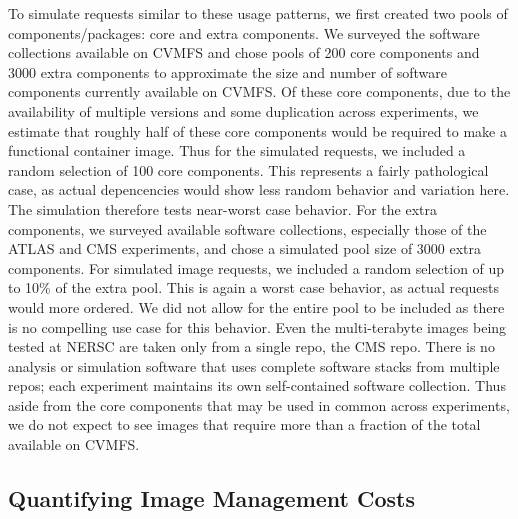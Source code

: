 \documentclass[sigconf]{acmart}
\begin{document}
To simulate requests similar to these usage patterns,
we first created two pools of components/packages: core and extra components.
We surveyed the software collections available on CVMFS and chose pools of 200 core components and 3000 extra components to approximate the size and number of software components currently available on CVMFS.
Of these core components,
due to the availability of multiple versions and some duplication across experiments,
we estimate that roughly half of these core components would be required to make a functional container image.
Thus for the simulated requests,
we included a random selection of 100 core components.
This represents a fairly pathological case,
as actual depencencies would show less random behavior and variation here.
The simulation therefore tests near-worst case behavior.
For the extra components,
we surveyed available software collections,
especially those of the ATLAS and CMS experiments,
and chose a simulated pool size of 3000 extra components.
For simulated image requests,
we included a random selection of up to 10\% of the extra pool.
This is again a worst case behavior,
as actual requests would more ordered.
We did not allow for the entire pool to be included as there is no compelling use case for this behavior.
Even the multi-terabyte images being tested at NERSC are taken only from a single repo,
the CMS repo.
There is no analysis or simulation software that uses complete software stacks from multiple repos;
each experiment maintains its own self-contained software collection.
Thus aside from the core components that may be used in common across experiments,
we do not expect to see images that require more than a fraction of the total available on CVMFS.

\subsection{Quantifying Image Management Costs}
\end{document}
